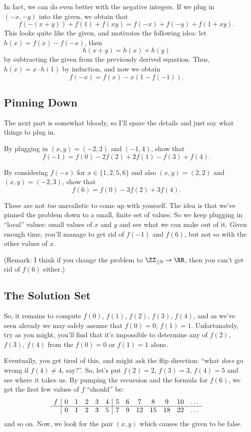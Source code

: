 \documentclass[11pt]{scrartcl}
\begin{document}
In fact, we can do even better with the negative integers.
If we plug in $(-x,-y)$ into the given, we obtain that
\[ f(-(x+y)) + f(1) + f(xy) = f(-x) + f(-y) + f(1+xy). \]
This looks quite like the given, and motivates the following idea:
let $h(x) = f(x)-f(-x)$, then
\[ h(x+y) = h(x) + h(y) \]
by subtracting the given from the previously derived equation.
Thus, $h(x) = x \cdot h(1)$ by induction, and now we obtain
\[ f(-x) = f(x) - x \left( 1-f(-1) \right). \]

\subsection{Pinning Down}
The next part is somewhat bloody, so I'll spare the details and just say what things to plug in.
\begin{exercise}
  By plugging in $(x,y)=(-2,2)$ and $(-1,4)$, show that
  \[ f(-1) = f(0) - 2f(2) + 2f(1) - f(3) + f(4). \]
\end{exercise}
\begin{exercise}
  By considering $f(-x)$ for $x\in\{1,2,5,6\}$ and also $(x,y) = (2,2)$ and $(x,y)=(-2,3)$,
  show that \[ f(6) = f(0) - 3f(2) + 3f(4). \]
\end{exercise}
These are not \emph{too} unrealistic to come up with yourself.
The idea is that we've pinned the problem down to a small, finite set of values.
So we keep plugging in ``local'' values: small values of $x$ and $y$
and see what we can make out of it.
Given enough time, you'll manage to get rid of $f(-1)$ and $f(6)$,
but not so with the other values of $x$.

(Remark: I think if you change the problem to $\ZZ_{\ge 0} \to \RR$,
then you can't get rid of $f(6)$ either.)

\subsection{The Solution Set}
So, it remains to compute $f(0)$, $f(1)$, $f(2)$, $f(3)$, $f(4)$,
and as we've seen already we may safely assume that $f(0) = 0$, $f(1) = 1$.
Unfortunately, try as you might, you'll find that it's impossible to determine
any of $f(2)$, $f(3)$, $f(4)$ from the $f(0) = 0$ or $f(1) = 1$ alone.

Eventually, you get tired of this, and might ask the flip direction:
``what \emph{does} go wrong if $f(4) \neq 4$, say?''.
So, let's put $f(2)=2$, $f(3)=3$, $f(4) = 5$ and see where it takes us.
By pumping the recursion and the formula for $f(6)$,
we get the first few values of $f$ ``should'' be:
\[
  \begin{array}{c|ccccc|ccccccr}
    f & 0 & 1 & 2 & 3 & 4 & 5 & 6 & 7 & 8 & 9 & 10 & \dots\\ \hline
      & 0 & 1 & 2 & 3 & 5 & 7 & 9 & 12& 15& 18& 22 & \dots
  \end{array}
\]
and so on.
Now, we look for the pair $(x,y)$ which causes the given to be false.
\end{document}
